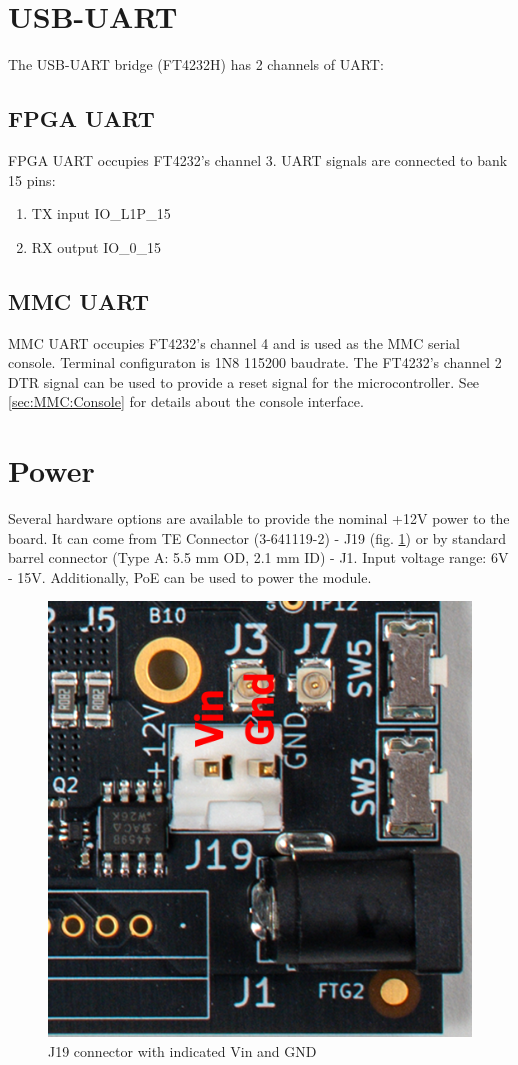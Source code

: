 \documentclass[12pt,oneside,a4]{article}
\begin{document}
\section{USB-UART}
The USB-UART bridge (FT4232H) has 2 channels of UART:
\subsection{FPGA UART}
FPGA UART occupies FT4232's channel 3. UART signals are connected to bank 15 pins:
\begin{enumerate}
	\item TX input IO\_L1P\_15
	\item RX output IO\_0\_15
\end{enumerate}
\subsection{MMC UART}
MMC UART occupies FT4232's channel 4 and is used as the MMC serial console. Terminal configuraton is 1N8 115200 baudrate. The FT4232's channel 2 DTR signal can be used to provide a reset signal for the microcontroller.
See \ref{sec:MMC:Console} for details about the console interface.


\section{Power}
Several hardware options are available to provide the nominal +12V power to the board.
It can come from TE Connector (3-641119-2) - J19 (fig. \ref{j19}) or by standard barrel connector (Type A: 5.5 mm OD, 2.1 mm ID) - J1. Input voltage range: 6V - 15V. Additionally, PoE can be used to power the module.

\begin{figure}[H]
\begin{center}
\includegraphics[width=0.6\linewidth]{j1j19.png}
 \caption{J19 connector with indicated Vin and GND}\label{j19}
\end{center}
\end{figure}
\end{document}
